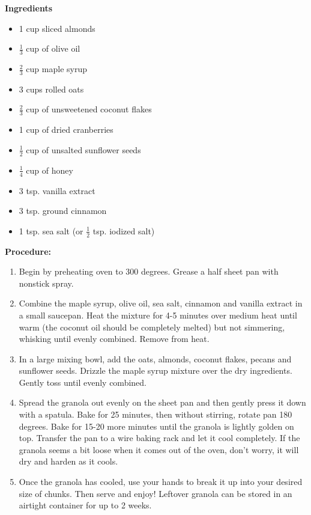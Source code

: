 \begin{multicols}{2}
\textbf{Ingredients}
\begin{itemize}
\item 1 cup sliced almonds 
\item $\frac{1}{3}$ cup of olive oil 
\item $\frac{2}{3}$ cup maple syrup 
\item 3 cups rolled oats 
\item $\frac{2}{3}$ cup of unsweetened coconut flakes 
\item 1 cup of dried cranberries 
\item $\frac{1}{2}$ cup of unsalted sunflower seeds
\item $\frac{1}{4}$ cup of honey
\item 3 tsp. vanilla extract
\item 3 tsp. ground cinnamon
\item 1 tsp. sea salt (or $\frac{1}{2}$ tsp. iodized salt)



\end{itemize}


\columnbreak
\textbf{Procedure:}
\medskip


\begin{enumerate}
\item Begin by preheating oven to 300 degrees. Grease a half sheet pan with nonstick spray. 

\item Combine the maple syrup, olive oil, sea salt, cinnamon and vanilla extract in a small saucepan. Heat the mixture for 4-5 minutes over medium heat until warm (the coconut oil should be completely melted) but not simmering, whisking until evenly combined. Remove from heat. 

\item In a large mixing bowl, add the oats, almonds, coconut flakes, pecans and sunflower seeds. Drizzle the maple syrup mixture over the dry ingredients. Gently toss until evenly combined.

\item Spread the granola out evenly on the sheet pan and then gently press it down with a spatula. Bake for 25 minutes, then without stirring, rotate pan 180 degrees. Bake for 15-20 more minutes until the granola is lightly golden on top. Transfer the pan to a wire baking rack and let it cool completely. If the granola seems a bit loose when it comes out of the oven, don’t worry, it will dry and harden as it cools.

\item Once the granola has cooled, use your hands to break it up into your desired size of chunks. Then serve and enjoy! Leftover granola can be stored in an airtight container for up to 2 weeks.


 
\end{enumerate}
\end{multicols}